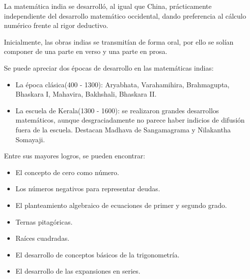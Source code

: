 \documentclass[compress, aspectratio=169]{beamer} %
\begin{document}
	\begin{frame}
		La matemática india se desarrolló, al igual que China, prácticamente independiente del desarrollo matemático
		occidental, dando preferencia al cálculo numérico frente al rigor deductivo.

		Inicialmente, las obras indias se transmitían de forma oral, por ello se solían componer de una parte en verso y
		una parte en prosa.
		
		\pause
		
		Se puede apreciar dos épocas de desarrollo en las matemáticas indias:
		\begin{itemize}
			\item La época clásica(400 - 1300): Aryabhata, Varahamihira, Brahmagupta, Bhaskara I, Mahavira,
			Bakhshali, Bhaskara II.
			\item La escuela de Kerala(1300 - 1600): se realizaron grandes desarrollos matemáticos, aunque desgraciadamente
			no parece haber indicios de difusión fuera de la escuela. Destacan Madhava de Sangamagrama y Nilakantha Somayaji.
		\end{itemize}
	\end{frame}
	\begin{frame}
		Entre sus mayores logros, se pueden encontrar:
		\begin{itemize}
			\item El concepto de cero como número.
			\item Los números negativos para representar deudas.
			\item El planteamiento algebraico de ecuaciones de primer y segundo grado.
			\item Ternas pitagóricas.
			\item Raíces cuadradas.
			\item El desarrollo de conceptos básicos de la trigonometría.
			\item El desarrollo de las expansiones en series.
		\end{itemize}
	\end{frame}
\end{document}
